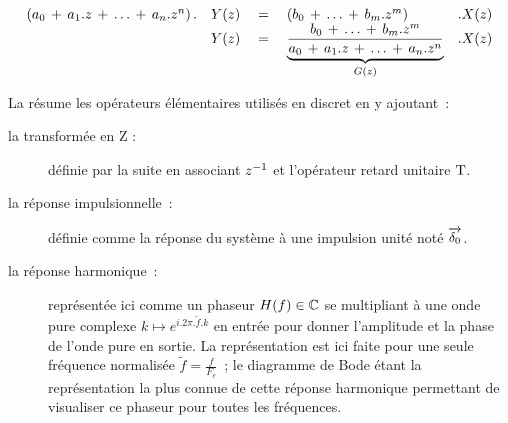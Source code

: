 \begin{equation}
  \begin{array}{lll}
    \left( a_0 \,+\, {a_1.z} \,+\,\dots \,+\, a_n.z^n \right).&Y(z) \quad=\quad \left(b_0 \,+\, \dots \,+\,  {b_m.z^m} \right) &.X(z) \nonumber \\
                 & Y(z)\quad=\quad\underbrace{\frac{b_0 \,+\, \dots \,+\,  {b_m.z^m}}{a_0 \,+\, {a_1.z} \,+\,\dots \,+\, a_n.z^n}}_{G(z)} &.X(z)
  \end{array}
\end{equation}


La  résume les opérateurs élémentaires utilisés en discret en y ajoutant~:
\begin{description}
\item[la transformée en Z :] définie par la suite en associant $z^{-1}$ et l'opérateur retard unitaire $\mathrm{T}$.
\item[la réponse impulsionnelle~:] définie comme la réponse du système à une impulsion unité noté $\d0$.
\item[la réponse harmonique~:] représentée ici comme un phaseur
  $H(f)\in\mathbb{C}$ se multipliant à une onde pure complexe
  $k\mapsto e^{i.2\pi.\tilde{f}.k}$ en entrée pour donner l'amplitude
  et la phase de l'onde pure en sortie. La représentation est ici
  faite pour une seule fréquence normalisée
  $\tilde{f}=\frac{f}{F_e}$~; le diagramme de Bode étant la
  représentation la plus connue de cette réponse harmonique permettant
  de visualiser ce phaseur pour toutes les fréquences.
\end{description}

